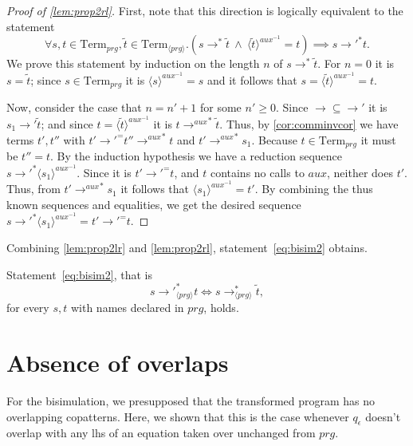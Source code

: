 \begin{proof}[Proof of \autoref{lem:prop2rl}]

First, note that this direction is logically equivalent to the statement
\[
\forall s, t \in \textrm{Term}_{prg}, \widetilde{t} \in \textrm{Term}_{\langle prg \rangle}. (s \longrightarrow^* \widetilde{t} ~ \land ~ \langle \widetilde{t} \rangle^{aux^{-1}} = t) \implies s {\longrightarrow'}^* t.
\]
We prove this statement by induction on the length $n$ of $s \longrightarrow^* \widetilde{t}$. For $n = 0$ it is $s = \widetilde{t}$; since $s \in \textrm{Term}_{prg}$ it is $\langle s \rangle^{aux^{-1}} = s$ and it follows that $s = \langle \widetilde{t} \rangle^{aux^{-1}} = t$. 

Now, consider the case that $n = n'+1$ for some $n' \geq 0$. Since $\longrightarrow \subseteq \longrightarrow'$ it is $s_1 \longrightarrow' \widetilde{t}$; and since $t = \langle \widetilde{t} \rangle^{aux^{-1}}$ it is $t {\longrightarrow^{aux}}^* \widetilde{t}$. Thus, by \autoref{cor:comminvcor} we have terms $t', t''$ with $t' {\longrightarrow'}^= t'' {\longrightarrow^{aux}}^* t$ and $t' {\longrightarrow^{aux}}^* s_1$. Because $t \in \textrm{Term}_{prg}$ it must be $t'' = t$. By the induction hypothesis we have a reduction sequence $s {\longrightarrow'}^* \langle s_1 \rangle^{aux^{-1}}$. Since it is $t' {\longrightarrow'}^= t$, and $t$ contains no calls to $aux$, neither does $t'$. Thus, from $t' {\longrightarrow^{aux}}^* s_1$ it follows that $\langle s_1 \rangle^{aux^{-1}} = t'$. By combining the thus known sequences and equalities, we get the desired sequence $s {\longrightarrow'}^* \langle s_1 \rangle^{aux^{-1}} = t' {\longrightarrow'}^= t$.

\end{proof}

Combining \autoref{lem:prop2lr} and \autoref{lem:prop2rl}, statement~\ref{eq:bisim2} obtains.
\begin{proposition}
\label{prop:bisim2}
Statement~\ref{eq:bisim2}, that is
\[
s {\longrightarrow'}_{\langle prg \rangle}^* t \iff s \longrightarrow^*_{\langle prg \rangle} \widetilde{t},
\]
for every $s, t$ with names declared in $prg$, holds.
\end{proposition}

\section{Absence of overlaps}
\label{sec:extrovl}

For the bisimulation, we presupposed that the transformed program has no overlapping copatterns. Here, we shown that this is the case whenever $q_\epsilon$ doesn't overlap with any lhs of an equation taken over unchanged from $prg$.

